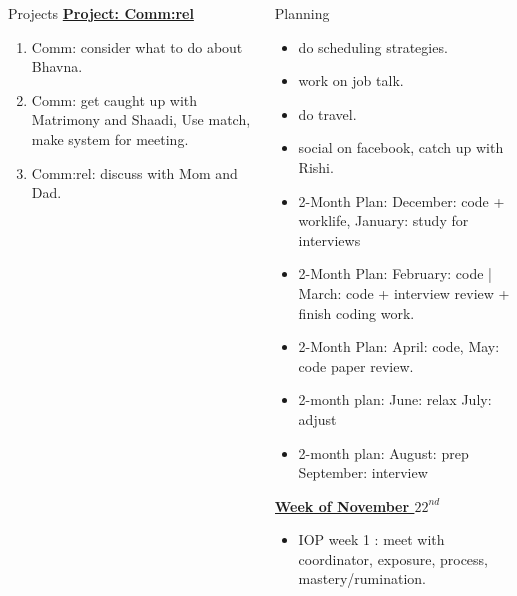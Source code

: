 \documentclass[serif, mathserif, final]{beamer}
\newcommand{\comments}[1]{}
\begin{document}
\begin{frame}
\begin{columns}
\begin{column}{0.5\textwidth}
\begin{block}{Projects}
{\underline{\textbf{Project: Comm:rel}}}
\begin{enumerate} 
  \tiny \item \tiny Comm: consider what to do about Bhavna.
\item \tiny Comm: get caught up with Matrimony and Shaadi, Use match,
  make system for meeting. 
\item \tiny Comm:rel: discuss with Mom and Dad. 
\end{enumerate} 
\end{block} 
\end{column}


\begin{column}{0.5\textwidth}
\begin{block}{Planning} 
\comments{
{\underline{\textit{2-month plans}}}
{\underline{\textit{January and February:}}}
{\underline{\textit{March and April:}} }
{\underline{\textit{May and June:}}}
}

\begin{itemize}
\tiny \item \tiny do scheduling strategies. 
\item \tiny work on job talk. 
\item \tiny do travel. 
\item \tiny social on facebook, catch up with Rishi. 
\end{itemize} 
\begin{itemize} 
\tiny \item \tiny 2-Month Plan: December: code + worklife, January: study for interviews
\item \tiny 2-Month Plan: February: code | March:  code + interview review + finish coding work. 
\item \tiny 2-Month Plan: April: code, May: code paper review.
\item \tiny 2-month plan: June: relax July: adjust 
\item \tiny 2-month plan: August:  prep September: interview 
\end{itemize}



\underline{{\bf Week of November $22^{nd}$ } }
\begin{itemize} 
\tiny \item \small IOP week 1 : meet with coordinator, exposure,
process, mastery/rumination. 
\end{itemize}


\end{block}
\end{column}
\end{columns}
\end{frame}
\end{document}

